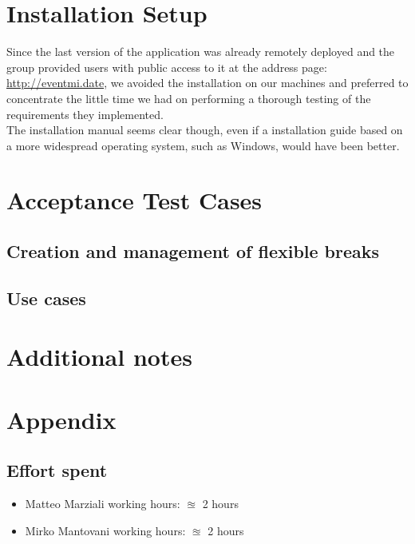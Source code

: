 \documentclass{article}
\begin{document}
\clearpage
\section{Installation Setup}
Since the last version of the application was already remotely deployed and the group provided users with public access to it at the address page: \href{url}{http://eventmi.date}, we avoided the installation on our machines and preferred to concentrate the little time we had on performing a thorough testing of the requirements they implemented.\\ The installation manual seems clear though, even if a installation guide based on a more widespread operating system, such as Windows, would have been better.

\clearpage
\section{Acceptance Test Cases}
\subsection{Creation and management of flexible breaks}


\clearpage
\subsection{Use cases}


\clearpage
\section{Additional notes}




\clearpage
\section{Appendix}

\subsection{Effort spent}
\begin{itemize}

\item Matteo Marziali working hours:  $\approxeq$ 2 hours

\item Mirko Mantovani working hours:  $\approxeq$ 2 hours



\end{itemize}
\end{document}
